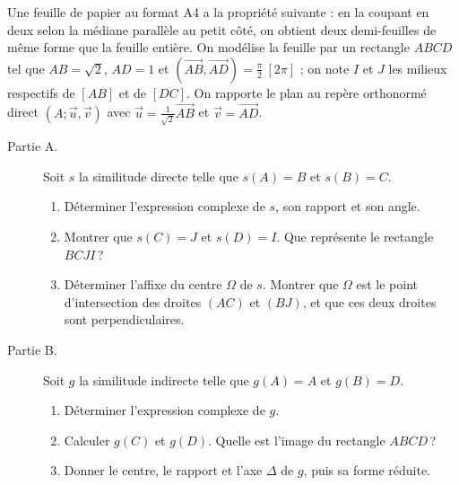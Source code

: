 \begin{exo}\label{exo:sim-format-a4}
      Une feuille de papier au format A4 a la propriété suivante : en la coupant en deux selon la médiane parallèle au petit côté,
      on obtient deux demi-feuilles de même forme que la feuille entière.
      On modélise la feuille par un rectangle $ABCD$ tel que $AB = \sqrt{2}$, $AD = 1$ et
      $(\overrightarrow{AB},\overrightarrow{AD}) = \frac{\pi}{2}\ [2\pi]$ ;
      on note $I$ et $J$ les milieux respectifs de $[AB]$ et de $[DC]$.
      On rapporte le plan au repère orthonormé direct $(A;\vec{u},\vec{v})$ avec $\vec{u} = \frac{1}{\sqrt{2}}\overrightarrow{AB}$ et $\vec{v} = \overrightarrow{AD}$.
      \begin{description}
            \item[Partie A.] Soit $s$ la similitude directe telle que $s(A) = B$ et $s(B) = C$.
                  \begin{enumerate}
                        \item Déterminer l'expression complexe de $s$, son rapport et son angle.
                        \item Montrer que $s(C) = J$ et $s(D) = I$. Que représente le rectangle $BCJI$\,?
                        \item Déterminer l'affixe du centre $\Omega$ de $s$. Montrer que $\Omega$ est le point d'intersection des droites $(AC)$ et $(BJ)$,
                              et que ces deux droites sont perpendiculaires.
                  \end{enumerate}
            \item[Partie B.] Soit $g$ la similitude indirecte telle que $g(A) = A$ et $g(B) = D$.
                  \begin{enumerate}
                        \item Déterminer l'expression complexe de $g$.
                        \item Calculer $g(C)$ et $g(D)$. Quelle est l'image du rectangle $ABCD$\,?
                        \item Donner le centre, le rapport et l'axe $\Delta$ de $g$, puis sa forme réduite.
                  \end{enumerate}
      \end{description}
\end{exo}
